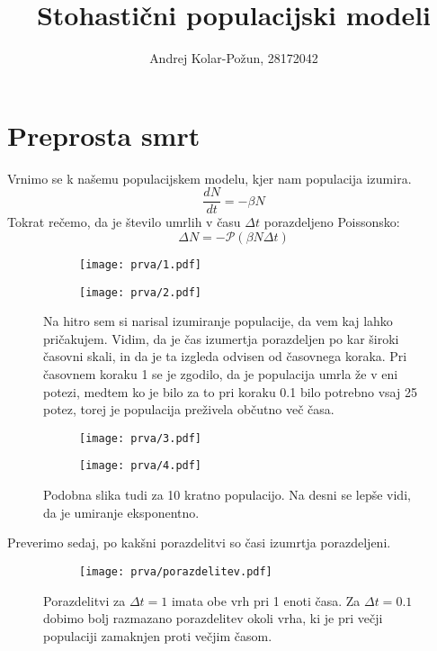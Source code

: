 \documentclass{article}
\title{Stohastični populacijski modeli}
\author{Andrej Kolar-Požun, 28172042}
\begin{document}
\maketitle
\newpage
{}
\section{Preprosta smrt}

Vrnimo se k našemu populacijskem modelu, kjer nam populacija izumira.
\begin{equation*}
\frac{dN}{dt} = -\beta N
\end{equation*}
Tokrat rečemo, da je število umrlih v času $\Delta t$ porazdeljeno Poissonsko:
\begin{equation*}
\Delta N = - \mathscr{P}(\beta N \Delta t)
\end{equation*}

\begin{figure}[H]
\centering
\begin{subfigure}{.49\textwidth}
\texttt{[image: prva/1.pdf]}
\end{subfigure}
\begin{subfigure}{.49\textwidth}
\texttt{[image: prva/2.pdf]}
\end{subfigure}
\caption*{Na hitro sem si narisal izumiranje populacije, da vem kaj lahko pričakujem. Vidim, da je čas izumertja porazdeljen po kar široki časovni skali, in da je ta izgleda odvisen od časovnega koraka. Pri časovnem koraku 1 se je zgodilo, da je populacija umrla že v eni potezi, medtem ko je bilo za to pri koraku 0.1 bilo potrebno vsaj 25 potez, torej je populacija preživela občutno več časa.}
\end{figure}
\begin{figure}[H]
\centering
\begin{subfigure}{.49\textwidth}
\texttt{[image: prva/3.pdf]}
\end{subfigure}
\begin{subfigure}{.49\textwidth}
\texttt{[image: prva/4.pdf]}
\end{subfigure}
\caption*{Podobna slika tudi za 10 kratno populacijo. Na desni se lepše vidi, da je umiranje eksponentno.}
\end{figure}

Preverimo sedaj, po kakšni porazdelitvi so časi izumrtja porazdeljeni.

\begin{figure}[H]
\centering
\begin{subfigure}{.7\textwidth}
\texttt{[image: prva/porazdelitev.pdf]}
\end{subfigure}
\caption*{Porazdelitvi za $\Delta t=1$ imata obe vrh pri 1 enoti časa. Za $\Delta t = 0.1$ dobimo bolj razmazano porazdelitev okoli vrha, ki je pri večji populaciji zamaknjen proti večjim časom.}
\end{figure}
\end{document}

